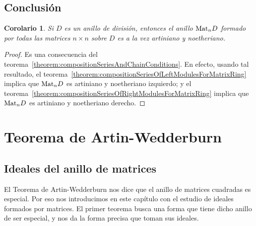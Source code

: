\documentclass{report}
\newcommand{\Mat}{\textnormal{Mat}}
\newtheorem{corollary}{Corolario}
\begin{document}
  \section{Conclusión}

  \begin{corollary}\label{corollary:matrixRingIsArtinianAndNoetherian}
    Si \(D\) es un anillo de división, entonces el anillo \(\Mat_n D\) formado por todas las matrices \(n \times n\) sobre \(D\) es a la vez artiniano y noetheriano.
  \end{corollary}
  \begin{proof}
    Es una consecuencia del teorema~\ref{theorem:compositionSeriesAndChainConditions}.
    En efecto, usando tal resultado, el teorema~\ref{theorem:compositionSeriesOfLeftModulesForMatrixRing} implica que \(\Mat_n D\) es artiniano y noetheriano izquierdo; y el teorema~\ref{theorem:compositionSeriesOfRightModulesForMatrixRing} implica que \(\Mat_n D\) es artiniano y noetheriano derecho.
  \end{proof}

  \chapter{Teorema de Artin-Wedderburn}

  \section{Ideales del anillo de matrices}

  El Teorema de Artin-Wedderburn nos dice que el anillo de matrices cuadradas es especial.
  Por eso nos introducimos en este capítulo con el estudio de ideales formados por matrices.
  El primer teorema busca una forma que tiene dicho anillo de ser especial, y nos da la forma precisa que toman sus ideales.
\end{document}
